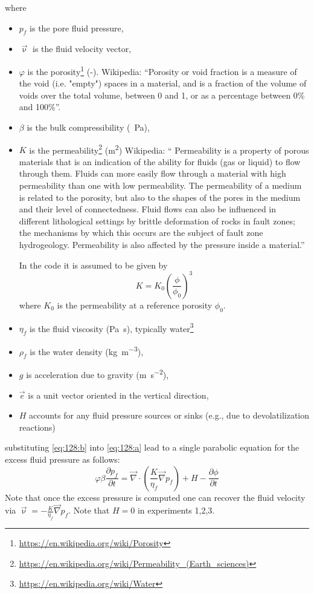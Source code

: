 \documentclass[a4paper]{article}
\begin{document}
where
\begin{itemize}
\item $p_f$ is the pore fluid pressure,
\item $\vec\upnu$ is the fluid velocity vector,
\item $\varphi$ is the porosity\footnote{\url{https://en.wikipedia.org/wiki/Porosity}} (-). 
Wikipedia: ``Porosity or void fraction is a measure of the void (i.e. "empty") spaces 
in a material, and is a fraction of the volume of voids over the total volume, 
between 0 and 1, or as a percentage between 0\% and 100\%''. 

\item $\beta$ is the bulk compressibility (\si{\per\pascal}),

\item $K$ is the permeability\footnote{\url{https://en.wikipedia.org/wiki/Permeability_(Earth_sciences)}} (\si{\square\meter})
Wikipedia: ``
Permeability is a property of porous materials that is an indication of the ability for fluids (gas or liquid) to flow through them. Fluids can more easily flow through a material with high permeability than one with low permeability. The permeability of a medium is related to the porosity, but also to the shapes of the pores in the medium and their level of connectedness. Fluid flows can also be influenced in different lithological settings by brittle deformation of rocks in fault zones; the mechanisms by which this occurs are the subject of fault zone hydrogeology. Permeability is also affected by the pressure inside a material.''

In the code it is assumed to be given by \textcite{skre16,begu18}
\[
K = K_0 \left( \frac{\phi}{\phi_0}  \right)^3
\]
where $K_0$ is the permeability at a reference porosity $\phi_0$.

\item $\eta_f$ is the fluid viscosity (\si{\pascal\second}), typically water\footnote{\url{https://en.wikipedia.org/wiki/Water}}
\item $\rho_f$ is the water density (\si{\kg\per\cubic\meter}),
\item $g$ is acceleration due to gravity (\si{\meter\per\square\second}),
\item $\vec{e}$ is a unit vector oriented in the vertical direction,
\item $H$ accounts for any fluid pressure sources or sinks (e.g., due to devolatilization reactions)
\end{itemize}
substituting \eqref{eq:128:b} into \eqref{eq:128:a} lead to a single parabolic equation for
the excess fluid pressure as follows:
\begin{equation}
\varphi \beta  \frac{\partial p_f}{\partial t}
=
\vec\nabla \cdot \left( \frac{K}{\eta_f} \vec\nabla p_f  \right) + H
-\frac{\partial \phi}{\partial t}
\end{equation}
Note that once the excess pressure is computed one can recover the fluid velocity via
$\vec\upnu=-\frac{K}{\eta_f} \vec\nabla p_f$.
Note that $H=0$ in experiments 1,2,3.
\end{document}
